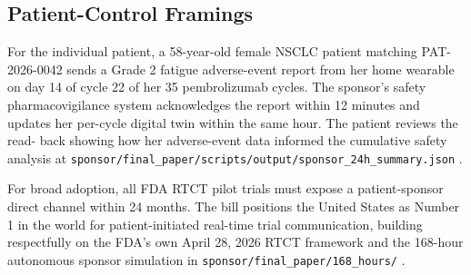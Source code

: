 \subsection{Patient-Control Framings}

For the individual patient, a 58-year-old female NSCLC patient
matching PAT-2026-0042 sends a Grade 2 fatigue adverse-event report
from her home wearable on day 14 of cycle 22 of her 35
pembrolizumab cycles. The sponsor's safety pharmacovigilance system
acknowledges the report within 12 minutes and updates her per-cycle
digital twin within the same hour. The patient reviews the read-
back showing how her adverse-event data informed the cumulative
safety analysis at
\texttt{sponsor/final\_paper/scripts/output/sponsor\_24h\_summary.json}
\cite{kawchak_2026_19119939, kawchak_2026_19396256}.

For broad adoption, all FDA RTCT pilot trials must expose a
patient-sponsor direct channel within 24 months. The bill positions
the United States as Number 1 in the world for patient-initiated
real-time trial communication, building respectfully on the FDA's
own April 28, 2026 RTCT framework and the 168-hour autonomous
sponsor simulation in \texttt{sponsor/final\_paper/168\_hours/}
\cite{kawchak_2026_19396256, kawchak_2026_19994945,
fda_rtct_press_2026}.
